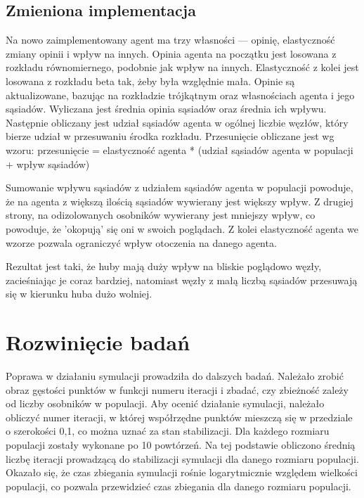 \documentclass{wfiisul}
\begin{document}
\subsection{Zmieniona implementacja}

Na nowo zaimplementowany agent ma trzy własności — opinię, elastyczność zmiany opinii i wpływ na innych.
Opinia agenta na początku jest losowana z rozkładu równomiernego, podobnie jak wpływ na innych.
Elastyczność z kolei jest losowana z rozkładu beta tak, żeby była względnie mała.
Opinie są aktualizowane, bazując na rozkładzie trójkątnym oraz własnościach agenta i jego sąsiadów.
Wyliczana jest średnia opinia sąsiadów oraz średnia ich wpływu.
Następnie obliczany jest udział sąsiadów agenta w ogólnej liczbie węzłów, który bierze udział w przesuwaniu środka rozkładu.
Przesunięcie obliczane jest wg wzoru:
przesunięcie = elastyczność agenta * (udział sąsiadów agenta w populacji + wpływ sąsiadów)

Sumowanie wpływu sąsiadów z udziałem sąsiadów agenta w populacji powoduje, że na agenta z większą ilością sąsiadów wywierany jest większy wpływ.
Z drugiej strony, na odizolowanych osobników wywierany jest mniejszy wpływ, co powoduje, że 'okopują' się oni w swoich poglądach.
Z kolei elastyczność agenta we wzorze pozwala ograniczyć wpływ otoczenia na danego agenta.

Rezultat jest taki, że huby mają duży wpływ na bliskie poglądowo węzły, zacieśniając je coraz bardziej, natomiast węzły z małą liczbą sąsiadów przesuwają się w kierunku huba dużo wolniej.

\section{Rozwinięcie badań}

Poprawa w działaniu symulacji prowadziła do dalszych badań. Należało zrobić obraz gęstości punktów w funkcji numeru iteracji i zbadać, czy zbieżność zależy od liczby osobników w populacji.
Aby ocenić działanie symulacji, należało obliczyć numer iteracji, w której współrzędne punktów mieszczą się w przedziale o szerokości 0,1, co można uznać za stan stabilizacji.
Dla każdego rozmiaru populacji zostały wykonane po 10 powtórzeń. Na tej podstawie obliczono średnią liczbę iteracji prowadzącą do stabilizacji symulacji dla danego rozmiaru populacji.
Okazało się, że czas zbiegania symulacji rośnie logarytmicznie względem wielkości populacji, co pozwala przewidzieć czas zbiegania dla danego rozmiaru populacji.
\end{document}
